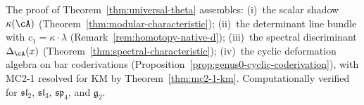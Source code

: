 \begin{remark}\label{rem:mc2-status}
The proof of Theorem~\ref{thm:universal-theta} assembles:
(i)~the scalar shadow $\kappa(\cA)$ (Theorem~\ref{thm:modular-characteristic});
(ii)~the determinant line bundle with $c_1=\kappa\cdot\lambda$
(Remark~\ref{rem:homotopy-native-d});
(iii)~the spectral discriminant $\Delta_{\cA}(x)$
(Theorem~\ref{thm:spectral-characteristic});
(iv)~the cyclic deformation algebra on bar coderivations
(Proposition~\ref{prop:genus0-cyclic-coderivation}), with
MC2-1 resolved for KM by Theorem~\ref{thm:mc2-1-km}.
Computationally verified for $\mathfrak{sl}_2$, $\mathfrak{sl}_3$,
$\mathfrak{sp}_4$, and $\mathfrak{g}_2$.
\end{remark}



